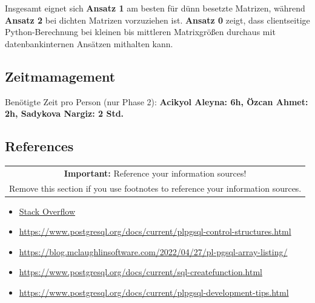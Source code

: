 \documentclass[11pt]{scrartcl}
\begin{document}
Insgesamt eignet sich \textbf{Ansatz 1} am besten für dünn besetzte Matrizen, während \textbf{Ansatz 2} bei dichten Matrizen vorzuziehen ist.
\textbf{Ansatz 0} zeigt, dass clientseitige Python-Berechnung bei kleinen bis mittleren Matrixgrößen durchaus mit datenbankinternen Ansätzen mithalten kann.


\subsection*{Zeitmamagement}

Benötigte Zeit pro Person (nur Phase 2): \textbf{Acikyol Aleyna: 6h, Özcan Ahmet: 2h, Sadykova Nargiz: 2 Std.}

\subsection*{References}

\begin{table}[H]
  \centering
  \begin{tabular}{c}
    \hline
    \textbf{Important:} Reference your information sources! \tabularnewline
    Remove this section if you use footnotes to reference your information sources. \tabularnewline
    \hline
  \end{tabular}
\end{table}

\begin{itemize}
    \item \href{https://stackoverflow.com/questions/56816817/how-to-get-cosine-distance-between-two-vectors-in-postgres/58095682#58095682}{Stack Overflow}
    \item \url{https://www.postgresql.org/docs/current/plpgsql-control-structures.html}
    \item \url{https://blog.mclaughlinsoftware.com/2022/04/27/pl-pgsql-array-listing/}
    \item \url{https://www.postgresql.org/docs/current/sql-createfunction.html}
    \item \url{https://www.postgresql.org/docs/current/plpgsql-development-tips.html}
\end{itemize}
\end{document}
